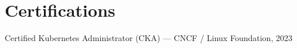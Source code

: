 \section*{Certifications}

\noindent Certified Kubernetes Administrator (CKA) --- CNCF / Linux Foundation, 2023
